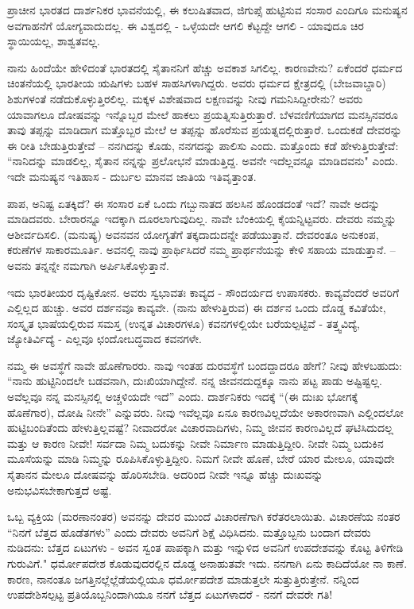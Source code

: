 ಪ್ರಾಚೀನ ಭಾರತದ ದಾರ್ಶನಿಕರ ಭಾವನೆಯಲ್ಲಿ, ಈ ಕಲುಷಿತವಾದ, ಜಿಗುಪ್ಸೆ ಹುಟ್ಟಿಸುವ ಸಂಸಾರ ಎಂದಿಗೂ ಮನುಷ್ಯನ ಅವಗಾಹನೆಗೆ ಯೋಗ್ಯವಾದುದಲ್ಲ. ಈ ವಿಶ್ವದಲ್ಲಿ - ಒಳ್ಳೆಯದೇ ಆಗಲಿ ಕೆಟ್ಟದ್ದೇ ಆಗಲಿ - ಯಾವುದೂ ಚಿರ ಸ್ಥಾಯಿಯಲ್ಲ, ಶಾಶ್ವತವಲ್ಲ.

ನಾನು ಹಿಂದೆಯೇ ಹೇಳಿದಂತೆ ಭಾರತದಲ್ಲಿ ಸೈತಾನನಿಗೆ ಹೆಚ್ಚು ಅವಕಾಶ ಸಿಗಲಿಲ್ಲ. ಕಾರಣವೇನು? ಏಕೆಂದರೆ ಧರ್ಮದ ಚಿಂತನೆಯಲ್ಲಿ ಭಾರತೀಯ ಋಷಿಗಳು ಬಹಳ ಸಾಹಸಿಗಳಾಗಿದ್ದರು. ಅವರು ಧರ್ಮದ ಕ್ಷೇತ್ರದಲ್ಲಿ (ಬೇಜವಾಬ್ದಾರಿ) ಶಿಶುಗಳಂತೆ ನಡೆದುಕೊಳ್ಳುತ್ತಿರಲಿಲ್ಲ. ಮಕ್ಕಳ ವಿಶೇಷವಾದ ಲಕ್ಷಣವನ್ನು ನೀವು ಗಮನಿಸಿದ್ದೀರೇನು? ಅವರು ಯಾವಾಗಲೂ ದೋಷವನ್ನು ಇನ್ನೊಬ್ಬರ ಮೇಲೆ ಹಾಕಲು ಪ್ರಯತ್ನಿಸುತ್ತಿರುತ್ತಾರೆ. ಬೆಳವಣಿಗೆಯಾಗದ ಮನಸ್ಸಿನವರೂ ತಾವು ತಪ್ಪನ್ನು ಮಾಡಿದಾಗ ಮತ್ತೊಬ್ಬರ ಮೇಲೆ ಆ ತಪ್ಪನ್ನು ಹೊರೆಸುವ ಪ್ರಯತ್ನದಲ್ಲಿರುತ್ತಾರೆ. ಒಂದುಕಡೆ ದೇವರನ್ನು ಈ ರೀತಿ ಬೇಡುತ್ತಿರುತ್ತೇವೆ – ನನಗಿದನ್ನು ಕೊಡು, ನನಗದನ್ನು ಪಾಲಿಸು ಎಂದು. ಮತ್ತೊಂದು ಕಡೆ ಹೇಳುತ್ತಿರುತ್ತೇವೆ: “ನಾನಿದನ್ನು ಮಾಡಲಿಲ್ಲ, ಸೈತಾನ ನನ್ನನ್ನು ಪ್ರಲೋಭನೆ ಮಾಡುತ್ತಿದ್ದ. ಅವನೇ ಇದೆಲ್ಲವನ್ನೂ ಮಾಡಿದವನು" ಎಂದು. ಇದೇ ಮನುಷ್ಯನ ಇತಿಹಾಸ - ದುರ್ಬಲ ಮಾನವ ಜಾತಿಯ ಇತಿವೃತ್ತಾಂತ.

ಪಾಪ, ಅನಿಷ್ಟ ಏತಕ್ಕಿದೆ? ಈ ಸಂಸಾರ ಏಕೆ ಒಂದು ಗಬ್ಬುನಾತದ ಹಲಸಿನ ಹೊಂಡದಂತೆ ಇದೆ? ನಾವೇ ಅದನ್ನು ಮಾಡಿದವರು. ಬೇರಾರನ್ನೂ ಇದಕ್ಕಾಗಿ ದೂರಲಾಗುವುದಿಲ್ಲ. ನಾವೇ ಬೆಂಕಿಯಲ್ಲಿ ಕೈಯನ್ನಿಟ್ಟವರು. ದೇವರು ನಮ್ಮನ್ನು ಆಶೀರ್ವದಿಸಲಿ. (ಮನುಷ್ಯ) ಅವನವನ ಯೋಗ್ಯತೆಗೆ ತಕ್ಕದಾದುದನ್ನೇ ಪಡೆಯುತ್ತಾನೆ. ದೇವರಂತೂ ಅನುಕಂಪ, ಕರುಣೆಗಳ ಸಾಕಾರಮೂರ್ತಿ. ಅವನಲ್ಲಿ ನಾವು ಪ್ರಾರ್ಥಿಸಿದರೆ ನಮ್ಮ ಪ್ರಾರ್ಥನೆಯನ್ನು ಕೇಳಿ ಸಹಾಯ ಮಾಡುತ್ತಾನೆ. – ಅವನು ತನ್ನನ್ನೇ ನಮಗಾಗಿ ಅರ್ಪಿಸಿಕೊಳ್ಳುತ್ತಾನೆ.

ಇದು ಭಾರತೀಯರ ದೃಷ್ಟಿಕೋನ. ಅವರು ಸ್ವಭಾವತಃ ಕಾವ್ಯದ - ಸೌಂದರ್ಯದ ಉಪಾಸಕರು. ಕಾವ್ಯವೆಂದರೆ ಅವರಿಗೆ ಎಲ್ಲಿಲ್ಲದ ಹುಚ್ಚು. ಅವರ ದರ್ಶನವೂ ಕಾವ್ಯವೇ. (ನಾನು ಹೇಳುತ್ತಿರುವ) ಈ ದರ್ಶನ ಒಂದು ದೊಡ್ಡ ಕವಿತೆಯೇ, ಸಂಸ್ಕೃತ ಭಾಷೆಯಲ್ಲಿರುವ ಸಮಸ್ತ (ಉನ್ನತ ವಿಚಾರಗಳೂ) ಕವನಗಳಲ್ಲಿಯೇ ಬರೆಯಲ್ಪಟ್ಟಿವೆ - ತತ್ತ್ವವಿದ್ಯೆ, ಜ್ಯೋತಿರ್ವಿದ್ಯೆ - ಎಲ್ಲವೂ ಛಂದೋಬದ್ಧವಾದ ಕವನಗಳೇ.

ನಮ್ಮ ಈ ಅವಸ್ಥೆಗೆ ನಾವೇ ಹೊಣೆಗಾರರು. ನಾವು ಇಂತಹ ದುರವಸ್ಥೆಗೆ ಬಂದದ್ದಾದರೂ ಹೇಗೆ? ನೀವು ಹೇಳಬಹುದು: “ನಾನು ಹುಟ್ಟಿನಿಂದಲೇ ಬಡವನಾಗಿ, ದುಃಖಿಯಾಗಿದ್ದೇನೆ. ನನ್ನ ಜೀವನದುದ್ದಕ್ಕೂ ನಾನು ಪಟ್ಟ ಪಾಡು ಅಷ್ಟಿಷ್ಟಲ್ಲ. ಅವೆಲ್ಲವೂ ನನ್ನ ಮನಸ್ಸಿನಲ್ಲಿ ಅಚ್ಚಳಿಯದೇ ಇದೆ'' ಎಂದು. ದಾರ್ಶನಿಕರು ಇದಕ್ಕೆ “(ಈ ದುಃಖ ಭೋಗಕ್ಕೆ ಹೊಣೆಗಾರ), ದೋಷಿ ನೀನೇ'' ಎನ್ನುವರು. ನೀವು ಇವೆಲ್ಲವೂ ಏನೂ ಕಾರಣವಿಲ್ಲದೆಯೇ ಅಕಾರಣವಾಗಿ ಎಲ್ಲಿಂದಲೋ ಹುಟ್ಟಿಬಂದಿತೆಂದು ಹೇಳುತ್ತಿಲ್ಲವಷ್ಟೆ? ನೀವಾದರೋ ವಿಚಾರವಾದಿಗಳು, ನಿಮ್ಮ ಜೀವನ ಕಾರಣವಿಲ್ಲದೆ ಘಟಿಸಿದುದಲ್ಲ ಮತ್ತು ಆ ಕಾರಣ ನೀವೇ! ಸರ್ವದಾ ನಿಮ್ಮ ಬದುಕನ್ನು ನೀವೇ ನಿರ್ಮಾಣ ಮಾಡುತ್ತಿದ್ದೀರಿ. ನೀವೇ ನಿಮ್ಮ ಬದುಕಿನ ಮೂಸೆಯನ್ನು ಮಾಡಿ ನಿಮ್ಮನ್ನು ರೂಪಿಸಿಕೊಳ್ಳುತ್ತಿದ್ದೀರಿ. ನಿಮಗೆ ನೀವೇ ಹೊಣೆ, ಬೇರೆ ಯಾರ ಮೇಲೂ, ಯಾವುದೇ ಸೈತಾನನ ಮೇಲೂ ದೋಷವನ್ನು ಹೊರಿಸಬೇಡಿ. ಅದರಿಂದ ನೀವೇ ಇನ್ನೂ ಹೆಚ್ಚು ದುಃಖವನ್ನು ಅನುಭವಿಸಬೇಕಾಗುತ್ತದೆ ಅಷ್ಟೆ.

ಒಬ್ಬ ವ್ಯಕ್ತಿಯ (ಮರಣಾನಂತರ) ಅವನನ್ನು ದೇವರ ಮುಂದೆ ವಿಚಾರಣೆಗಾಗಿ ಕರೆತರಲಾಯಿತು. ವಿಚಾರಣೆಯ ನಂತರ “ನಿನಗೆ  ಬೆತ್ತದ ಹೊಡೆತಗಳು'' ಎಂದು ದೇವರು ಅವನಿಗೆ ಶಿಕ್ಷೆ ವಿಧಿಸಿದನು. ಮತ್ತೊಬ್ಬನು ಬಂದಾಗ ದೇವರು ನುಡಿದನು:  ಬೆತ್ತದ ಏಟುಗಳು -  ಅವನ ಸ್ವಂತ ಪಾಪಕ್ಕಾಗಿ ಮತ್ತು ಇನ್ನುಳಿದ  ಅವನಿಗೆ ಉಪದೇಶವನ್ನು ಕೊಟ್ಟ ತಿಳಿಗೇಡಿ ಗುರುವಿಗೆ." ಧರ್ಮೋಪದೇಶ ಕೊಡುವುದರಲ್ಲಿನ ದೊಡ್ಡ ಅನಾಹುತವೇ ಇದು. ನನಗಾಗಿ ಏನು ಕಾದಿದೆಯೋ ನಾ ಕಾಣೆ. ಕಾರಣ, ನಾನಂತೂ ಜಗತ್ತಿನಲ್ಲೆಲ್ಲೆಡೆಯಲ್ಲಿಯೂ ಧರ್ಮೋಪದೇಶ ಮಾಡುತ್ತಲೇ ಸುತ್ತುತ್ತಿರುತ್ತೇನೆ. ನನ್ನಿಂದ ಉಪದೇಶಿಸಲ್ಪಟ್ಟ ಪ್ರತಿಯೊಬ್ಬನಿಂದಾಗಿಯೂ ನನಗೆ  ಬೆತ್ತದ ಏಟುಗಳಾದರೆ - ನನಗೆ ದೇವರೇ ಗತಿ!

